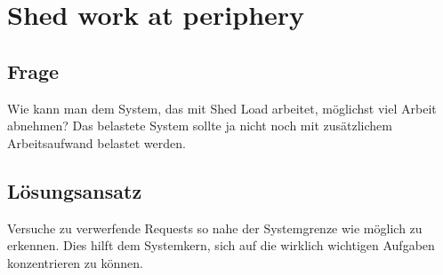 \section{Shed work at periphery}

\subsection{Frage}


Wie kann man dem System, das mit Shed Load arbeitet, möglichst viel Arbeit abnehmen? Das belastete System sollte ja nicht noch mit zusätzlichem Arbeitsaufwand belastet werden.

\subsection{Lösungsansatz}


Versuche zu verwerfende Requests so nahe der Systemgrenze wie möglich zu erkennen. Dies hilft dem Systemkern, sich auf die wirklich wichtigen Aufgaben konzentrieren zu können.
